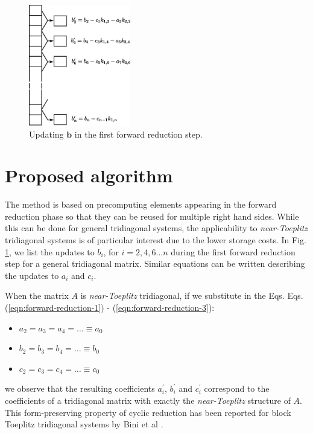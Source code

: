 \documentclass{elsarticle}
\begin{document}
\begin{figure}
\begin{center}
\includegraphics[height=150pt]{img/forward-reduction-step.eps}
\end{center}
\caption{Updating $\bm{b}$ in the first forward reduction step.}
\label{fig:forward-reduction-step}
\end{figure}

\section{Proposed algorithm} \label{sec:proposed-algorithm}

The method is based on precomputing elements 
appearing in the forward reduction phase
so that they can be reused for multiple right hand sides.
While this can be done for general tridiagonal systems,
the applicability to \emph{near-Toeplitz} tridiagonal systems is
of particular interest due to the lower storage costs.
In Fig. \ref{fig:forward-reduction-step},
we list the updates to
$b_i$, for $i=2, 4, 6 ... n$
during the first forward reduction step
for a general tridiagonal matrix.
Similar equations can be written describing
the updates to $a_i$ and  $c_i$.

When the matrix $A$ is \emph{near-Toeplitz} tridiagonal,
if we substitute in the Eqs.
Eqs. (\ref{eqn:forward-reduction-1}) -
(\ref{eqn:forward-reduction-3}):

\begin{itemize}
\item [] $a_2 = a_3 = a_4 = \hdots \equiv a_0$
\item [] $b_2 = b_3 = b_4 = \hdots \equiv b_0$
\item [] $c_2 = c_3 = c_4 = \hdots \equiv c_0$
\end{itemize}
%
we observe that the resulting coefficients
$a_i^\prime$, $b_i^\prime$ and $c_i^\prime$
correspond to the coefficients of a tridiagonal matrix with
exactly the \emph{near-Toeplitz} structure of $A$.
This form-preserving property of cyclic reduction
has been reported for block Toeplitz tridiagonal systems
by Bini et al \cite{bini}.
\end{document}

